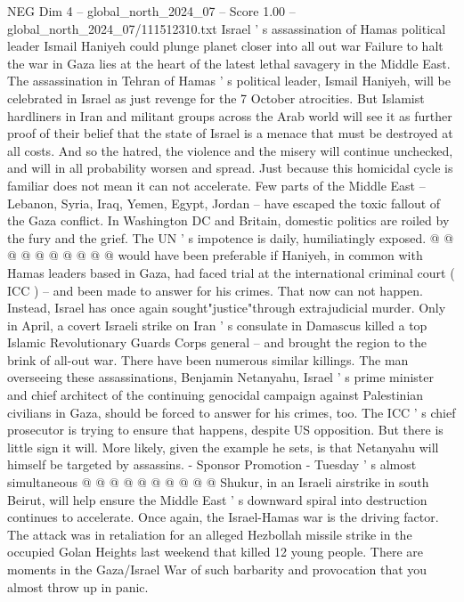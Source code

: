 \begin{textsample}{NEG Dim 4 – global\_north\_2024\_07 – Score 1.00 – global\_north\_2024\_07/111512310.txt}  \label{ex:f4_neg_270}
Israel ' s assassination of Hamas political leader Ismail Haniyeh could plunge planet closer into all out war Failure to halt the war in Gaza lies at the heart of the latest lethal savagery in the Middle East.
The assassination in Tehran of Hamas ' s political leader, Ismail Haniyeh, will be celebrated in Israel as just revenge for the 7 October atrocities.
But Islamist hardliners in Iran and militant groups across the Arab world will see it as further proof of their belief that the state of Israel is a menace that must be destroyed at all costs.
And so the hatred, the violence and the misery will continue unchecked, and will in all probability worsen and spread.
Just because this homicidal cycle is familiar does not mean it can not accelerate.
Few parts of the Middle East -- Lebanon, Syria, Iraq, Yemen, Egypt, Jordan -- have escaped the toxic fallout of the Gaza conflict.
In Washington DC and Britain, domestic politics are roiled by the fury and the grief.
The UN ' s impotence is daily, humiliatingly exposed. @ @ @ @ @ @ @ @ @ @ would have been preferable if Haniyeh, in common with Hamas leaders based in Gaza, had faced trial at the international criminal court ( ICC ) -- and been made to answer for his crimes.
That now can not happen.
Instead, Israel has once again sought"justice"through extrajudicial murder.
Only in April, a covert Israeli strike on Iran ' s consulate in Damascus killed a top Islamic Revolutionary Guards Corps general -- and brought the region to the brink of all-out war.
There have been numerous similar killings.
The man overseeing these assassinations, Benjamin Netanyahu, Israel ' s prime minister and chief architect of the continuing genocidal campaign against Palestinian civilians in Gaza, should be forced to answer for his crimes, too.
The ICC ' s chief prosecutor is trying to ensure that happens, despite US opposition.
But there is little sign it will.
More likely, given the example he sets, is that Netanyahu will himself be targeted by assassins. - Sponsor Promotion - Tuesday ' s almost simultaneous @ @ @ @ @ @ @ @ @ @ Shukur, in an Israeli airstrike in south Beirut, will help ensure the Middle East ' s downward spiral into destruction continues to accelerate.
Once again, the Israel-Hamas war is the driving factor.
The attack was in retaliation for an alleged Hezbollah missile strike in the occupied Golan Heights last weekend that killed 12 young people.
There are moments in the Gaza/Israel War of such barbarity and provocation that you almost throw up in panic.

\end{textsample}
